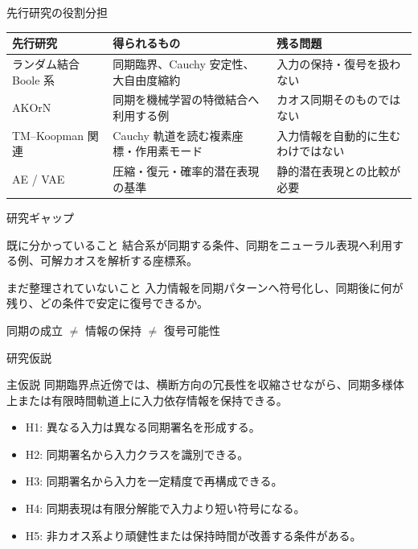 \documentclass[aspectratio=169,11pt]{beamer}
\begin{document}
\begin{frame}{先行研究の役割分担}
  \small
  \begin{tabular}{p{}p{}p{}}
    \toprule
    先行研究 & 得られるもの & 残る問題 \\
    \midrule
    ランダム結合 Boole 系 & 同期臨界、Cauchy 安定性、大自由度縮約 & 入力の保持・復号を扱わない \\
    AKOrN & 同期を機械学習の特徴結合へ利用する例 & カオス同期そのものではない \\
    TM--Koopman 関連 & Cauchy 軌道を読む複素座標・作用素モード & 入力情報を自動的に生むわけではない \\
    AE / VAE & 圧縮・復元・確率的潜在表現の基準 & 静的潜在表現との比較が必要 \\
    \bottomrule
  \end{tabular}
\end{frame}

\begin{frame}{研究ギャップ}
  \begin{block}{既に分かっていること}
    結合系が同期する条件、同期をニューラル表現へ利用する例、可解カオスを解析する座標系。
  \end{block}
  \begin{alertblock}{まだ整理されていないこと}
    入力情報を同期パターンへ符号化し、同期後に何が残り、どの条件で安定に復号できるか。
  \end{alertblock}
  \vfill
  \centering
  \Large
  同期の成立 \(\ne\) 情報の保持 \(\ne\) 復号可能性
\end{frame}

\begin{frame}{研究仮説}
  \begin{alertblock}{主仮説}
    同期臨界点近傍では、横断方向の冗長性を収縮させながら、同期多様体上または有限時間軌道上に入力依存情報を保持できる。
  \end{alertblock}
  \begin{itemize}
    \item H1: 異なる入力は異なる同期署名を形成する。
    \item H2: 同期署名から入力クラスを識別できる。
    \item H3: 同期署名から入力を一定精度で再構成できる。
    \item H4: 同期表現は有限分解能で入力より短い符号になる。
    \item H5: 非カオス系より頑健性または保持時間が改善する条件がある。
  \end{itemize}
\end{frame}
\end{document}
